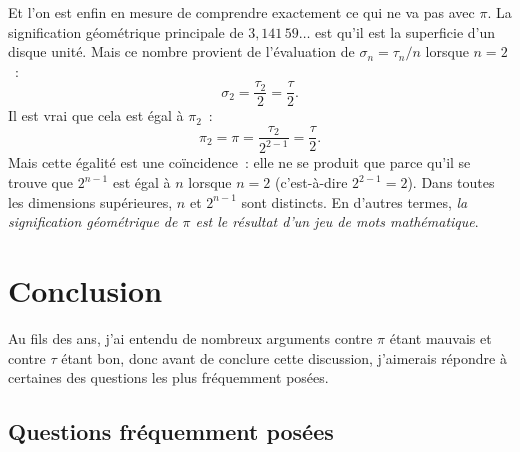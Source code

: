 Et l'on est enfin en mesure de comprendre exactement ce qui ne va pas avec $\pi$. La
signification géométrique principale de $3{,}141\,59\ldots$ est qu'il est la
superficie d'un disque unité. Mais ce nombre provient de l'évaluation de
$\sigma_n = \tau_n/n$ lorsque $n=2$~:
\[
\sigma_2 = \frac{\tau_2}{2} = \frac{\tau}{2}.
\]
Il est vrai que cela est égal à $\pi_2$~:
\[
\pi_2 = \pi = \frac{\tau_2}{2^{2-1}} = \frac{\tau}{2}.
\]
Mais cette égalité est une coïncidence~: elle ne se produit que parce qu'il se
trouve que $2^{n-1}$ est égal à $n$ lorsque $n=2$ (c'est-à-dire $2^{2-1} = 2$).
Dans toutes les dimensions supérieures, $n$ et $2^{n-1}$ sont distincts. En
d'autres termes, \emph{la signification géométrique de $\pi$ est le résultat
d'un jeu de mots mathématique}.


\section{Conclusion}
\label{sec:conclusion}

Au fils des ans, j'ai entendu de nombreux arguments contre $\pi$ étant mauvais
et contre $\tau$ étant bon, donc avant de conclure cette discussion, j'aimerais répondre à
certaines des questions les plus fréquemment posées.

  \subsection{Questions fréquemment posées} %
  \label{sec:faq}

